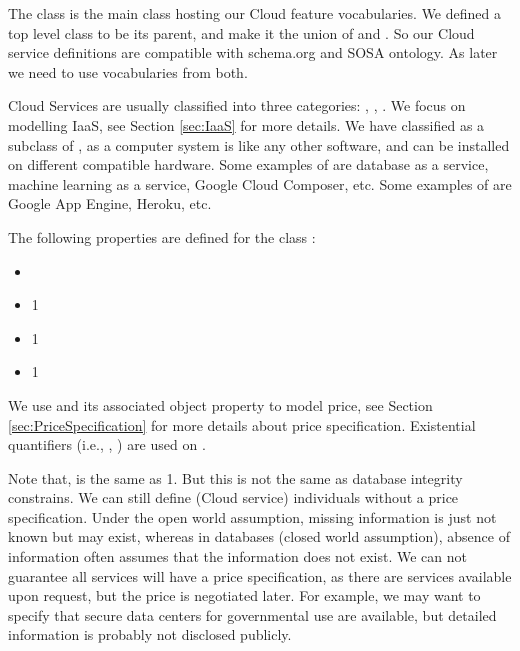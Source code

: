 The class  is the main class hosting our Cloud feature vocabularies.
We defined a top level class  to be its parent, and make it the union of  and .
So our Cloud service definitions are compatible with schema.org and SOSA ontology.
As later we need to use vocabularies from both.

Cloud Services are usually classified into three categories:
, , .
We focus on modelling IaaS, see Section \ref{sec:IaaS} for more details.
We have classified  as a subclass of ,
as a computer system is like any other software, and can be installed on different compatible hardware.
Some examples of  are database as a service, machine learning as a service, Google Cloud Composer, etc.
Some examples of  are Google App Engine, Heroku, etc.

The following properties are defined for the class :
\begin{itemize}
    \item[]   
    \item[]   1 
    \item[]   1 
    \item[]   1 
\end{itemize}

We use  and its associated object property 
to model price, see Section \ref{sec:PriceSpecification} for more details about price specification.
Existential quantifiers (i.e., , ) are used on .

Note that,  is the same as  1. 
But this is not the same as database integrity constrains.
We can still define (Cloud service) individuals without a price specification.
Under the open world assumption, missing information is just not known but may exist, whereas in databases (closed world assumption), absence of information often assumes that the information does not exist.
We can not guarantee all services will have a price specification, as there are services available upon request, but the price is negotiated later. For example, we may want to specify that secure data centers for governmental use
are available, but detailed information is probably not disclosed publicly.


